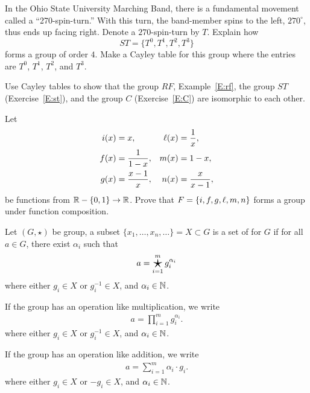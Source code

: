 \documentclass{ximera}
\begin{document}
\begin{exercise}\label{E:st}
  In the Ohio State University Marching Band, there is a fundamental
  movement called a ``270-spin-turn.'' With this turn, the band-member
  spins to the left, $270^\circ$, thus ends up facing right. Denote a
  $270$-spin-turn by $T$. Explain how
  \[
  ST=\{T^0,T^1,T^2,T^3\}
  \]
  forms a group of order $4$. Make a Cayley table for this group where
  the entries are $T^0$, $T^1$, $T^2$, and $T^3$.
\end{exercise}

\begin{exercise}
  Use Cayley tables to show that the group $RF$, Example~\ref{E:rf},
  the group $ST$ (Exercise~\ref{E:st}), and the group $C$
  (Exercise~\ref{E:C}) are isomorphic to each other.
\end{exercise}



\begin{exercise}\label{E:invg}
  Let
  \begin{align*}
    i(x) &= x,             & \ell(x) &= \frac{1}{x}, \\
    f(x) &= \frac{1}{1-x}, &  m(x) &= 1-x, \\
    g(x) &= \frac{x-1}{x}, &  n(x) &= \frac{x}{x-1},
  \end{align*}
  be functions from $\mathbb R-\{0,1\}\to\mathbb R$.  Prove that $F = \{i,f,g,\ell,m,n\}$
  forms a group under function composition.
\end{exercise}


\begin{definition}
  Let $(G,\star)$ be group, a subset $\{x_1,\dots, x_n,\dots\}=X\subset
  G$ is a set of  for $G$ if for all $a\in G$, there
  exist $\alpha_i$ such that
  \[
  a =\prodstar_{i=1}^m g_i^{\alpha_i}
  \]
  where either $g_i\in X$ or $g_i^{-1}\in X$, and $\alpha_i\in \mathbb N$.
  
  If the group has an operation like multiplication, we write
  \begin{align*}
  a =  \prod_{i=1}^m g_i^{\alpha_i}.
  \end{align*}
  where either $g_i\in X$ or $g_i^{-1}\in X$, and $\alpha_i\in \mathbb N$.

  If the group has an operation like addition, we write
  \begin{align*}
  a =  \sum_{i=1}^m \alpha_i \cdot g_i.
  \end{align*}
  where either $g_i\in X$ or $-g_i\in X$, and $\alpha_i\in \mathbb N$.
\end{definition}
\end{document}
